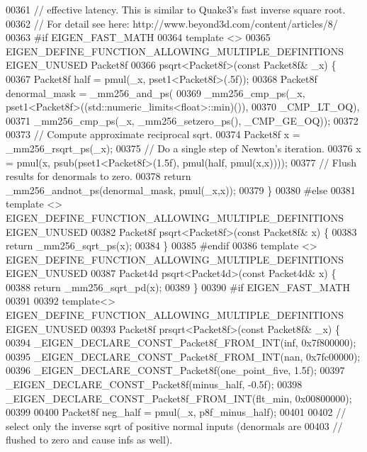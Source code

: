\begin{DoxyCode}
00361 \textcolor{comment}{// effective latency. This is similar to Quake3's fast inverse square root.}
00362 \textcolor{comment}{// For detail see here: http://www.beyond3d.com/content/articles/8/}
00363 \textcolor{preprocessor}{#if EIGEN\_FAST\_MATH}
00364 \textcolor{keyword}{template} <>
00365 EIGEN\_DEFINE\_FUNCTION\_ALLOWING\_MULTIPLE\_DEFINITIONS EIGEN\_UNUSED Packet8f
00366 psqrt<Packet8f>(\textcolor{keyword}{const} Packet8f& \_x) \{
00367   Packet8f half = pmul(\_x, pset1<Packet8f>(.5f));
00368   Packet8f denormal\_mask = \_mm256\_and\_ps(
00369       \_mm256\_cmp\_ps(\_x, pset1<Packet8f>((std::numeric\_limits<float>::min)()),
00370                     \_CMP\_LT\_OQ),
00371       \_mm256\_cmp\_ps(\_x, \_mm256\_setzero\_ps(), \_CMP\_GE\_OQ));
00372 
00373   \textcolor{comment}{// Compute approximate reciprocal sqrt.}
00374   Packet8f x = \_mm256\_rsqrt\_ps(\_x);
00375   \textcolor{comment}{// Do a single step of Newton's iteration.}
00376   x = pmul(x, psub(pset1<Packet8f>(1.5f), pmul(half, pmul(x,x))));
00377   \textcolor{comment}{// Flush results for denormals to zero.}
00378   \textcolor{keywordflow}{return} \_mm256\_andnot\_ps(denormal\_mask, pmul(\_x,x));
00379 \}
00380 \textcolor{preprocessor}{#else}
00381 \textcolor{keyword}{template} <> EIGEN\_DEFINE\_FUNCTION\_ALLOWING\_MULTIPLE\_DEFINITIONS EIGEN\_UNUSED
00382 Packet8f psqrt<Packet8f>(\textcolor{keyword}{const} Packet8f& x) \{
00383   \textcolor{keywordflow}{return} \_mm256\_sqrt\_ps(x);
00384 \}
00385 \textcolor{preprocessor}{#endif}
00386 \textcolor{keyword}{template} <> EIGEN\_DEFINE\_FUNCTION\_ALLOWING\_MULTIPLE\_DEFINITIONS EIGEN\_UNUSED
00387 Packet4d psqrt<Packet4d>(\textcolor{keyword}{const} Packet4d& x) \{
00388   \textcolor{keywordflow}{return} \_mm256\_sqrt\_pd(x);
00389 \}
00390 \textcolor{preprocessor}{#if EIGEN\_FAST\_MATH}
00391 
00392 \textcolor{keyword}{template}<> EIGEN\_DEFINE\_FUNCTION\_ALLOWING\_MULTIPLE\_DEFINITIONS EIGEN\_UNUSED
00393 Packet8f prsqrt<Packet8f>(\textcolor{keyword}{const} Packet8f& \_x) \{
00394   \_EIGEN\_DECLARE\_CONST\_Packet8f\_FROM\_INT(inf, 0x7f800000);
00395   \_EIGEN\_DECLARE\_CONST\_Packet8f\_FROM\_INT(nan, 0x7fc00000);
00396   \_EIGEN\_DECLARE\_CONST\_Packet8f(one\_point\_five, 1.5f);
00397   \_EIGEN\_DECLARE\_CONST\_Packet8f(minus\_half, -0.5f);
00398   \_EIGEN\_DECLARE\_CONST\_Packet8f\_FROM\_INT(flt\_min, 0x00800000);
00399 
00400   Packet8f neg\_half = pmul(\_x, p8f\_minus\_half);
00401 
00402   \textcolor{comment}{// select only the inverse sqrt of positive normal inputs (denormals are}
00403   \textcolor{comment}{// flushed to zero and cause infs as well).}

\end{DoxyCode}
